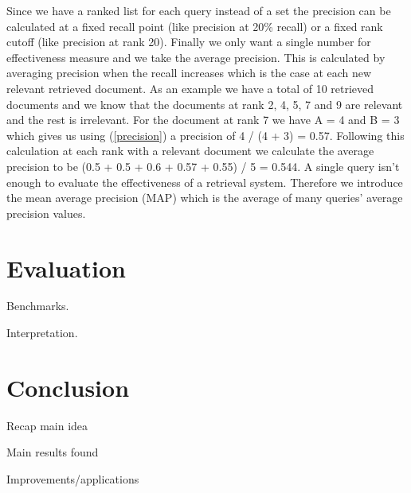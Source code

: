 \documentclass[journal]{IEEEtran}
\begin{document}
Since we have a ranked list for each query instead of a set the precision can be calculated at a fixed recall point (like precision at 20\% recall) or a fixed rank cutoff (like precision at rank 20).
Finally we only want a single number for effectiveness measure and we take the average precision.
This is calculated by averaging precision when the recall increases which is the case at each new relevant retrieved document.
As an example we have a total of 10 retrieved documents and we know that the documents at rank 2, 4, 5, 7 and 9 are relevant and the rest is irrelevant.
For the document at rank 7 we have A = 4 and B = 3 which gives us using (\ref{precision}) a precision of 4 / (4 + 3) = 0.57.
Following this calculation at each rank with a relevant document we calculate the average precision to be (0.5 + 0.5 + 0.6 + 0.57 + 0.55) / 5 = 0.544.
A single query isn't enough to evaluate the effectiveness of a retrieval system.
Therefore we introduce the mean average precision (MAP) which is the average of many queries' average precision values.



\section{Evaluation}
Benchmarks.

Interpretation.



\section{Conclusion}
Recap main idea

Main results found

Improvements/applications

\cite{gollins01}
\cite{peters12}
\cite{savoy09}
\cite{yu09}
\cite{oard97b}
\cite{fujita01}



\end{document}
